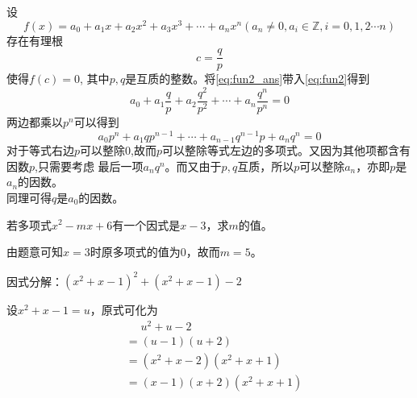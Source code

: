 \documentclass[windows,csize4]{BHCexam}
\begin{document}
\begin{groups}
    设
    \begin{equation}
        \label{eq:fun2}
        f(x)=a_0+a_1 x+a_2 x^2+a_3 x^3 +\cdots +a_n x^n 
        (a_n\neq 0, a_i\in \mathbb{Z}, i=0,1,2\cdots n)
    \end{equation}
    存在有理根
    \begin{equation}
        \label{eq:fun2_ans}
        c=\frac{q}{p}    
    \end{equation}
    使得$f(c)=0$, 其中$p,q$是互质的整数。将\ref{eq:fun2_ans}带入\ref{eq:fun2}得到
    \begin{equation}
        \label{eq:fun3}
        a_0+a_1\frac{q}{p}+a_2\frac{q^2}{p^2}+\cdots +a_n\frac{q^n}{p^n} = 0
    \end{equation}
    两边都乘以$p^n$可以得到
    \begin{equation}
        \label{eq:fun4}
        a_0p^n+a_1qp^{n-1}+\cdots+ a_{n-1}q^{n-1}p + a_nq^n = 0
    \end{equation}
    对于等式右边$p$可以整除$0$,故而$p$可以整除等式左边的多项式。又因为其他项都含有因数$p$,只需要考虑
    最后一项$a_n q^n$。而又由于$p,q$互质，所以$p$可以整除$a_n$，亦即$p$是$a_n$的因数。\\ 
    同理可得$q$是$a_0$的因数。
\end{groups}


\begin{groups}

    \begin{questions}[]
        \question[5] 若多项式$x^2-mx+6$有一个因式是$x-3$，求$m$的值。
        \begin{solution}{0.5cm}
            \methodonly 由题意可知$x=3$时原多项式的值为$0$，故而$m=5$。
        \end{solution}
        \vspace{3.5cm}





        \question[5]因式分解：$(x^2+x-1)^2+(x^2+x-1)-2$
        \begin{solution}{0.5cm}
            \methodonly 设$x^2+x-1=u$，原式可化为
            \[
                \begin{aligned}
                     & \phantom{=}u^2+u-2   \\
                     & =(u-1)(u+2)          \\
                     & =(x^2+x-2)(x^2+x+1)  \\
                     & =(x-1)(x+2)(x^2+x+1)
                \end{aligned}
            \]
        \end{solution}
        \vspace{4cm}


    \end{questions}
\end{groups}

\label{lastpage}
\end{document}
